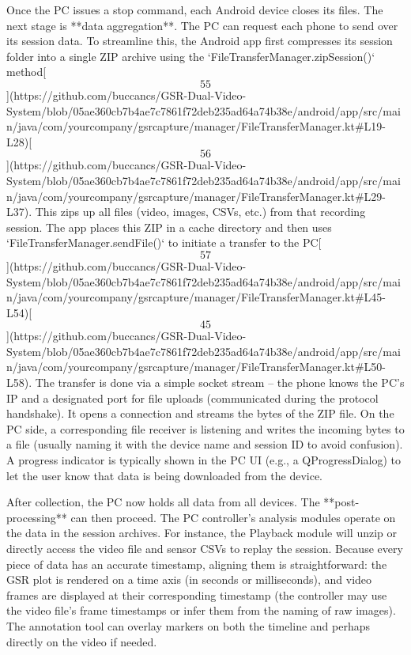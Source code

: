 \documentclass[12pt,a4paper]{article}
\begin{document}
{Once the PC issues a stop command, each Android device closes its files.
The next stage is **data aggregation**. The PC can request each phone to
send over its session data. To streamline this, the Android app first
compresses its session folder into a single ZIP archive using the
`FileTransferManager.zipSession()`
method[\[55\]](https://github.com/buccancs/GSR-Dual-Video-System/blob/05ae360cb7b4ae7c7861f72deb235ad64a74b38e/android/app/src/main/java/com/yourcompany/gsrcapture/manager/FileTransferManager.kt#L19-L28)[\[56\]](https://github.com/buccancs/GSR-Dual-Video-System/blob/05ae360cb7b4ae7c7861f72deb235ad64a74b38e/android/app/src/main/java/com/yourcompany/gsrcapture/manager/FileTransferManager.kt#L29-L37).
This zips up all files (video, images, CSVs, etc.) from that recording
session. The app places this ZIP in a cache directory and then uses
`FileTransferManager.sendFile()` to initiate a transfer to the
PC[\[57\]](https://github.com/buccancs/GSR-Dual-Video-System/blob/05ae360cb7b4ae7c7861f72deb235ad64a74b38e/android/app/src/main/java/com/yourcompany/gsrcapture/manager/FileTransferManager.kt#L45-L54)[\[45\]](https://github.com/buccancs/GSR-Dual-Video-System/blob/05ae360cb7b4ae7c7861f72deb235ad64a74b38e/android/app/src/main/java/com/yourcompany/gsrcapture/manager/FileTransferManager.kt#L50-L58).
The transfer is done via a simple socket stream -- the phone knows the
PC's IP and a designated port for file uploads (communicated during the
protocol handshake). It opens a connection and streams the bytes of the
ZIP file. On the PC side, a corresponding file receiver is listening and
writes the incoming bytes to a file (usually naming it with the device
name and session ID to avoid confusion). A progress indicator is
typically shown in the PC UI (e.g., a QProgressDialog) to let the user
know that data is being downloaded from the device.

After collection, the PC now holds all data from all devices. The
**post-processing** can then proceed. The PC controller's analysis
modules operate on the data in the session archives. For instance, the
Playback module will unzip or directly access the video file and sensor
CSVs to replay the session. Because every piece of data has an accurate
timestamp, aligning them is straightforward: the GSR plot is rendered on
a time axis (in seconds or milliseconds), and video frames are displayed
at their corresponding timestamp (the controller may use the video
file's frame timestamps or infer them from the naming of raw images).
The annotation tool can overlay markers on both the timeline and perhaps
directly on the video if needed.

}
\end{document}
